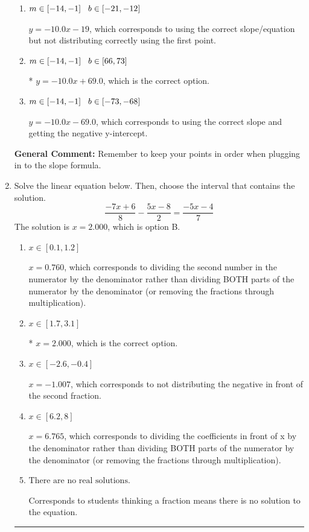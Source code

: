 \documentclass{extbook}[14pt]
\newcommand{\litem}[1]{\item #1

\rule{\textwidth}{0.4pt}}
\begin{document}
\begin{enumerate}
{\begin{enumerate}[label=\Alph*.]
 $y = 10.0x -51.0$, which corresponds to using the negative slope and the correct equation.
\item \( m \in [-14, -1] \hspace*{3mm} b \in [-21, -12] \)

 $y = -10.0x -19$, which corresponds to using the correct slope/equation but not distributing correctly using the first point.
\item \( m \in [-14, -1] \hspace*{3mm} b \in [66, 73] \)

* $y = -10.0x + 69.0$, which is the correct option.
\item \( m \in [-14, -1] \hspace*{3mm} b \in [-73, -68] \)

 $y = -10.0x -69.0$, which corresponds to using the correct slope and getting the negative y-intercept.
\end{enumerate}

\textbf{General Comment:} Remember to keep your points in order when plugging in to the slope formula.
}
\litem{
Solve the linear equation below. Then, choose the interval that contains the solution.
\[ \frac{-7x + 6}{8} - \frac{5x -8}{2} = \frac{-5x -4}{7} \]The solution is \( x = 2.000 \), which is option B.\begin{enumerate}[label=\Alph*.]
\item \( x \in [0.1, 1.2] \)

 $x = 0.760$, which corresponds to dividing the second number in the numerator by the denominator rather than dividing BOTH parts of the numerator by the denominator (or removing the fractions through multiplication).
\item \( x \in [1.7, 3.1] \)

* $x = 2.000$, which is the correct option.
\item \( x \in [-2.6, -0.4] \)

 $x = -1.007$, which corresponds to not distributing the negative in front of the second fraction.
\item \( x \in [6.2, 8] \)

 $x = 6.765$, which corresponds to dividing the coefficients in front of x by the denominator rather than dividing BOTH parts of the numerator by the denominator (or removing the fractions through multiplication).
\item \( \text{There are no real solutions.} \)

Corresponds to students thinking a fraction means there is no solution to the equation.
\end{enumerate}

}
\end{enumerate}
\end{document}
